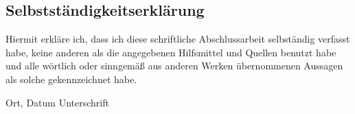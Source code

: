\begin{otherlanguage}{german}
\begin{fullwidth}
    \chapter*{Selbstständigkeitserklärung}
    Hiermit erkläre ich, dass ich diese schriftliche Abschlussarbeit selbständig verfasst habe, keine anderen als die angegebenen Hilfsmittel und Quellen benutzt habe und alle wörtlich oder sinngemäß aus anderen Werken übernommenen Aussagen als solche gekennzeichnet habe.
\end{fullwidth}
\vskip 3cm
Ort, Datum	\hfill Unterschrift
\end{otherlanguage}
